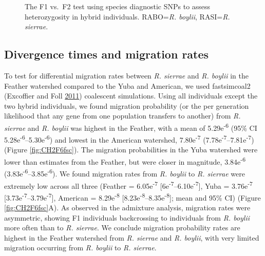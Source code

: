 \documentclass[proquest,12pt,final]{ucthesis-CA2012} %
\begin{document}
\begin{ucmainmatter}
\begin{figure}
{}

\caption{The F1 vs.~F2 test using species diagnostic SNPs to
assess heterozygosity in hybrid individuals. RABO=\emph{R. boylii},
RASI=\emph{R. sierrae}.}\label{fig:CH2F5gentest}
\end{figure}
\clearpage

\hypertarget{divergence-times-and-migration-rates}{%
\subsection{Divergence times and migration
rates}\label{divergence-times-and-migration-rates}}

To test for differential migration rates between \emph{R. sierrae} and
\emph{R. boylii} in the Feather watershed compared to the Yuba and
American, we used fastsimcoal2 (Excoffier and Foll
\protect\hyperlink{ref-excoffier_fastsimcoal_2011}{2011}) coalescent
simulations. Using all individuals except the two hybrid individuals, we
found migration probability (or the per generation likelihood that any
gene from one population transfers to another) from \emph{R. sierrae}
and \emph{R. boylii} was highest in the Feather, with a mean of
5.29e\textsuperscript{-6} (95\% CI
5.28e\textsuperscript{-6}--5.30e\textsuperscript{-6}) and lowest in the
American watershed, 7.80e\textsuperscript{-7}
(7.78e\textsuperscript{-7}--7.81e\textsuperscript{-7})(Figure
\ref{fig:CH2F6fsc}). The migration probabilities in the Yuba watershed
were lower than estimates from the Feather, but were closer in
magnitude, 3.84e\textsuperscript{-6}
(3.83e\textsuperscript{-6}--3.85e\textsuperscript{-6}). We found
migration rates from \emph{R. boylii} to \emph{R. sierrae} were
extremely low across all three (Feather = 6.05e\textsuperscript{-7}
{[}6e\textsuperscript{-7}--6.10e\textsuperscript{-7}{]}, Yuba =
3.76e\textsuperscript{-7}
{[}3.73e\textsuperscript{-7}--3.79e\textsuperscript{-7}{]}, American =
8.29e\textsuperscript{-8}
{[}8.23e\textsuperscript{-8}--8.35e\textsuperscript{-8}{]}; mean and
95\% CI) (Figure \ref{fig:CH2F6fsc}A). As observed in the admixture
analysis, migration rates were asymmetric, showing F1 individuals
backcrossing to individuals from \emph{R. boylii} more often than to
\emph{R. sierrae}. We conclude migration probability rates are highest
in the Feather watershed from \emph{R. sierrae} and \emph{R. boylii},
with very limited migration occurring from \emph{R. boylii} to \emph{R.
sierrae}.






\end{ucmainmatter}
\end{document}
